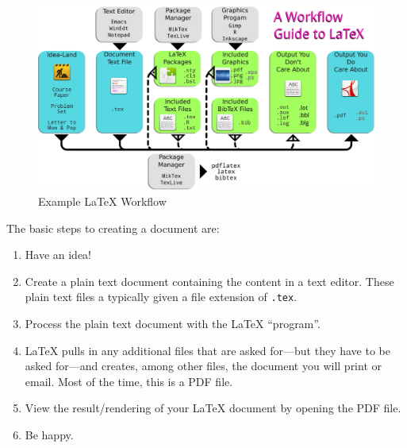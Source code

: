\begin{figure}
  \caption{Example \LaTeX{} Workflow}
  \label{fig:workflow}
  \begin{center}
    \includegraphics[scale=.5,angle=90]{extra/workflow.pdf}

  \end{center}
\end{figure}


The basic steps to creating a document are:
\begin{enumerate}
\item Have an idea!

\item Create a plain text document containing the content in a text
  editor. These plain text files a typically given a file extension of
  \verb=.tex=.

\item Process the plain text document with the \LaTeX{} ``program''.

\item \LaTeX{} pulls in any additional files that are asked for---but they have
  to be asked for---and creates, among other files, the document you will print
  or email. Most of the time, this is a PDF file.

\item View the result/rendering of your \LaTeX{} document by opening the PDF
  file.

\item Be happy.

\end{enumerate}

